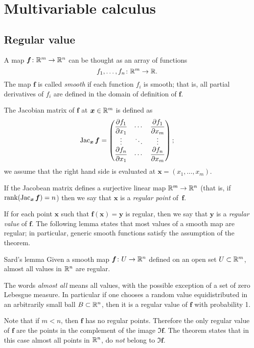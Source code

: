 \chapter{Multivariable calculus}

\section*{Regular value}

A map $\bm{f}\colon\mathbb{R}^m\to\mathbb{R}^n$ can be thought as an array of functions 
\[f_1,\dots,f_n\colon\mathbb{R}^m\to \mathbb{R}.\]
The map $\bm{f}$ is called \emph{smooth} if each function $f_i$ is smooth;
that is, all partial derivatives of $f_i$ are defined in the domain of definition of $\bm{f}$.

The Jacobian matrix of $\bm{f}$ at $\bm{x}\in\mathbb{R}^m$ is defined as
\[\mathop{\rm Jac}\nolimits_{\bm{x}}\bm{f}=
\begin{pmatrix}
\dfrac{\partial f_1}{\partial x_1} & \cdots & \dfrac{\partial f_1}{\partial x_m}\\
\vdots & \ddots & \vdots\\
\dfrac{\partial f_n}{\partial x_1} & \cdots & \dfrac{\partial f_n}{\partial x_m} \end{pmatrix};\]
we assume that the right hand side is evaluated at $\bm{x}=(x_1,\dots,x_m)$.

If the Jacobean matrix defines a surjective linear map $\mathbb{R}^m\to\mathbb{R}^n$ (that is, if $\mathop{\rm rank}\nolimits(\mathop{\rm Jac}\nolimits_{\bm{x}}\bm{f})=n$) then we say that 
$\bm{x}$ is a \emph{regular point} of~$\bm{f}$.

If for each point $\bm{x}$ such that $\bm{f}(\bm{x})=\bm{y}$ is regular,
then we say that $\bm{y}$ is a \emph{regular value} of $\bm{f}$.
The following lemma states that most values of a smooth map are regular;
in particular, generic smooth functions satisfy the assumption of the theorem.

\begin{thm}{Sard's lemma}\label{lem:sard}
Given a smooth map $\bm{f}\colon U \z\to \RR^n$ defined on an open set $U\subset \mathbb{R}^m$, almost all values in $\mathbb{R}^n$ are regular.
\end{thm}

The words \emph{almost all} means all values, with the possible exception of a set of zero Lebesgue measure.
In particular if one chooses a random value equidistributed in an arbitrarily small ball $B\subset \mathbb{R}^n$, then it is a regular value of $\bm{f}$ with probability 1.

Note that if $m<n$, then $\bm{f}$ has no regular points.
Therefore the only regular value of $\bm{f}$ are the points in the complement of the image $\Im \bm{f}$.
The theorem states that in this case almost all points in $\mathbb{R}^n$, do \emph{not} belong to $\Im \bm{f}$.


